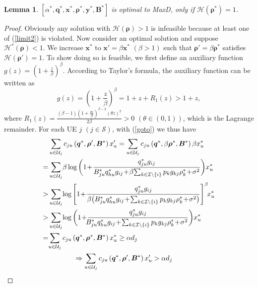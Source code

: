 \documentclass[10pt,journal,final,finalsubmission,twocolumn]{IEEEtran}
\newtheorem{lemma}[theorem]{Lemma}
\begin{document}
\begin{lemma}\label{property 1}
$[\alpha ^*, \boldsymbol{q}^*,\boldsymbol{x}^*,\boldsymbol{\rho}^*, \boldsymbol{y}^*, \boldsymbol{B}^*]$ is optimal to MaxD, only if $\mathcal{H}(\boldsymbol{\rho^*}) = 1$.
\end{lemma}
\begin{proof} 
Obviously any solution with $\mathcal{H}(\boldsymbol{\rho}) > 1$ is infeasible because at least one of (\ref{limit2}) is violated. Now consider an optimal solution and suppose $\mathcal{H^*}(\boldsymbol{\rho}) < 1$. We increase $\boldsymbol{x}^*$ to $\boldsymbol{x}' =\beta\boldsymbol{x}^*$ $(\beta >1)$ such that $\boldsymbol{\rho}' =\beta\boldsymbol{\rho}^*$ satisfies $\mathcal{H}(\boldsymbol{\rho}') =1$. To show doing so is feasible, we first define an auxiliary function $g(z) = (1+\frac{z}{\beta})^\beta$. According to Taylor's formula, the auxiliary function can be written as
\begin{equation}\label{goto}
g(z) =(1+\frac{z}{\beta})^\beta=1+z+R_1(z)>1+z,
\end{equation}
where $R_1(z)=\frac {(\beta-1)(1+\frac{\theta z}{\beta})^{\beta-2}(\theta z)^2}{2\beta}>0$ $(\theta \in (0,1))$, which is the Lagrange remainder. For each UE $j$ $(j\in \mathcal{S})$, with (\ref{goto}) we thus have
\begin{align}
&\sum\limits_{u\in \mathcal{U}_j} c_{ju}\left (\boldsymbol{q}^*,\boldsymbol{ \rho}', \boldsymbol{B}^*\right ) x_u'=\sum\limits_{u\in \mathcal{U}_j} c_{ju}\left (\boldsymbol{q}^*,\beta\boldsymbol{ \rho}^*, \boldsymbol{B}^*\right ) \beta x_u^*\notag\\
=&\sum\limits_{u\in \mathcal{U}_j}\!\beta\log \bigg ( 1\!+\!\frac{q_{ju}^*g_{ij}}{{B_{ju}^*q_{hu}^*g_{ij}}\!+\!\beta{\sum\nolimits_{ k\in \mathcal{I}\setminus \left \{ i \right \}}p_kg_{kj}\rho_k^*}\!+\!\sigma ^2} \bigg ) x_u^*\notag\\
>& \sum\limits_{u\in \mathcal{U}_j}\!\log \Bigg [ 1\!+\!\frac{q_{ju}^*g_{ij}}{\beta\big({B_{ju}^*q_{hu}^*g_{ij}}\!+\!{\sum\nolimits_{k\in \mathcal{I}\setminus \left \{ i \right \}}p_kg_{kj}\rho_k^*}\!+\!\sigma ^2\big)} \Bigg ]^\beta \!x_u^*\label{lemma1-1}\notag\\
>&\sum\limits_{u\in \mathcal{U}_j}\!\log \bigg ( 1\!+\!\frac{q_{ju}^*g_{ij}}{\!\!{B_{ju}^*q_{hu}^*g_{ij}}\!+\!{\sum\nolimits_{k\in \mathcal{I}\setminus \left \{ i \right \}}p_kg_{kj}\rho_k^*}\!+\!\sigma ^2} \bigg ) x_u^*\notag\\
=&\!\sum\limits_{u\in \mathcal{U}_j} c_{ju}\left (\boldsymbol{q}^*,\boldsymbol{ \rho}^*, \boldsymbol{B}^*\right )  x_u^*\geq\alpha d_j\notag\\
\ &\ \ \ \ \ \ \ \ \ \ \ \Rightarrow \sum\limits_{u\in \mathcal{U}_j} c_{ju}\left (\boldsymbol{q}^*,\boldsymbol{ \rho}', \boldsymbol{B}^*\right ) x_u'>\alpha d_j
\end{align}


\end{proof}
\end{document}
